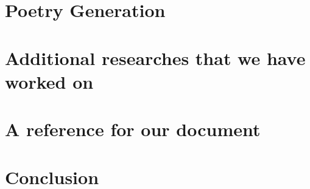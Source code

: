 \section{Poetry Generation}


\section{Additional researches that we have worked on}




\section{A reference for our document}


\section{Conclusion}



